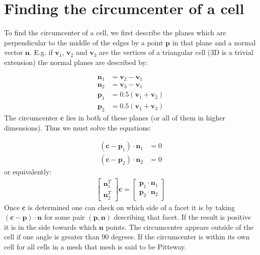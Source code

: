 \documentclass[12pt]{article}
\renewcommand{\vec}{\mathbf}
\begin{document}
\section{Finding the circumcenter of a cell}
To find the circumcenter of a cell, we first describe the planes which are perpendicular to the middle of the edges by a point $\vec p$ in that plane and a normal vector $\vec n$. E.g. if $\vec v_1$, $\vec v_2$ and $\vec v_3$ are the vertices of a triangular cell (3D is a trivial extension) the normal planes are described by:

\begin{align}
	\vec n_1 &= \vec v_2 - \vec v_1 \\
	\vec n_2 &= \vec v_3 - \vec v_1 \\
	\vec p_1 &= 0.5(\vec v_1 + \vec v_2) \\
	\vec p_2 &= 0.5(\vec v_1 + \vec v_3)
\end{align}
The circumcenter $\vec c$ lies in both of these planes (or all of them in higher dimensions). Thus we must solve the equations:

\begin{align}
	(\vec c-\vec p_1)\cdot \vec n_1 &= 0 \\
	(\vec c-\vec p_2)\cdot \vec n_2 &= 0
\end{align}
or equivalently:
\begin{align}
	\begin{bmatrix}
		\vec n_1^T \\
		\vec n_2^T
	\end{bmatrix} \vec c =
	\begin{bmatrix}
		\vec p_1\cdot\vec n_1 \\
		\vec p_2\cdot\vec n_2
	\end{bmatrix}
\end{align}
Once $\vec c$ is determined one can check on which side of a facet it is by taking $(\vec c-\vec p)\cdot\vec n$ for some pair $(\vec p,\vec n)$ describing that facet. If the result is positive it is in the side towards which $\vec n$ points. The circumcenter appears outside of the cell if one angle is greater than 90 degrees. If the circumcenter is within its own cell for all cells in a mesh that mesh is said to be Pitteway.
\end{document}
